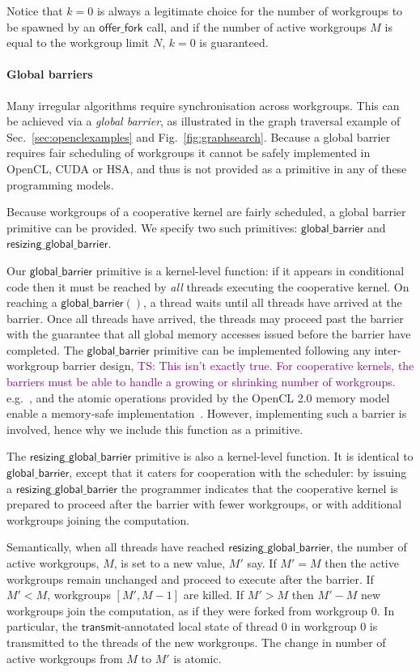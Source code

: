 \documentclass[numbers,nocopyrightspace,10pt]{sigplanconf}
\newcommand{\TSComment}[1]{\textcolor{purple}{TS: #1}}
\newcommand{\myfig}{Fig.~}
\newcommand{\mysec}{Sec.~}
\newcommand{\transmit}{\mathsf{transmit}}
\newcommand{\offerfork}{\mathsf{offer\_fork}}
\newcommand{\globalbarrier}{\mathsf{global\_barrier}}
\newcommand{\resizingglobalbarrier}{\mathsf{resizing\_global\_barrier}}
\begin{document}
Notice that $k=0$ is always a legitimate choice for the number of
workgroups to be spawned by an $\offerfork$ call, and if the number of
active workgroups $M$ is equal to the workgroup limit $N$, $k=0$ is
guaranteed.

\paragraph{Global barriers}

Many irregular algorithms require synchronisation across workgroups.
This can be achieved via a \emph{global barrier}, as illustrated in the graph traversal example of \mysec\ref{sec:openclexamples} and \myfig\ref{fig:graphsearch}.
Because a global barrier requires fair scheduling of workgroups it cannot be safely implemented in OpenCL, CUDA or HSA, and thus is not provided as a primitive in any of these programming models.

Because workgroups of a cooperative kernel are fairly scheduled, a
global barrier primitive can be provided.  We specify two such primitives: $\globalbarrier$
and $\resizingglobalbarrier$.

Our $\globalbarrier$ primitive is a kernel-level function: if it
appears in conditional code then it must be reached by \emph{all}
threads executing the cooperative kernel.  On reaching a
$\globalbarrier()$, a thread waits until all threads have arrived at
the barrier.  Once all threads have arrived, the threads may proceed
past the barrier with the guarantee that all global memory accesses
issued before the barrier have completed.  The $\globalbarrier$
primitive can be implemented following any inter-workgroup barrier
design, \TSComment{This isn't exactly true. For cooperative kernels,
  the barriers must be able to handle a growing or shrinking number of
  workgroups.} e.g.~\cite{...}, and the atomic operations provided by
the OpenCL 2.0 memory model enable a memory-safe
implementation~\cite{...}.  However, implementing such a barrier is
involved, hence why we include this function as a primitive.

The $\resizingglobalbarrier$ primitive is also a kernel-level
function.  It is identical to $\globalbarrier$, except that it caters
for cooperation with the scheduler: by issuing a
$\resizingglobalbarrier$ the programmer indicates that the cooperative
kernel is prepared to proceed after the barrier with fewer workgroups,
or with additional workgroups joining the computation.

Semantically, when all threads have reached $\resizingglobalbarrier$,
the number of active workgroups, $M$, is set to a new value, $M'$ say.
If $M' = M$ then the active workgroups remain unchanged and proceed to
execute after the barrier.  If $M' < M$, workgroups $[M', M-1]$ are
killed.  If $M' > M$ then $M'-M$ new workgroups join the computation,
as if they were forked from workgroup 0.  In particular, the
$\transmit$-annotated local state of thread 0 in workgroup 0 is
transmitted to the threads of the new workgroups.  The change in
number of active workgroups from $M$ to $M'$ is atomic.
\end{document}
